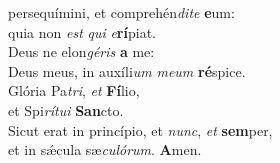 \evenverse  persequímini, et comprehén\textit{di}\textit{te} \textbf{e}um:~\*\\
\evenverse quia non \textit{est} \textit{qui} \textit{e}\textbf{rí}piat.\\
\oddverse Deus ne elon\textit{gé}\textit{ris} \textbf{a} me:~\*\\
\oddverse Deus meus, in auxíli\textit{um} \textit{me}\textit{um} \textbf{ré}spice.\\
\evenverse Glória Pa\textit{tri}, \textit{et} \textbf{Fí}lio,~\*\\
\evenverse et Spi\textit{rí}\textit{tu}\textit{i} \textbf{San}cto.\\
\oddverse Sicut erat in princípio, et \textit{nunc}, \textit{et} \textbf{sem}per,~\*\\
\oddverse et in sǽcula sæ\textit{cu}\textit{ló}\textit{rum}. \textbf{A}men.\\
